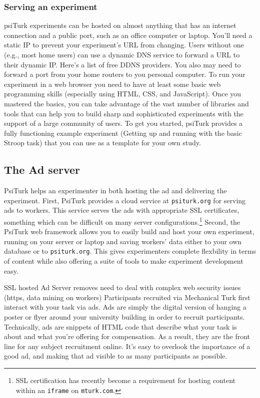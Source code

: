 \documentclass[jou,apacite]{apa6}
\begin{document}
\subsubsection{Serving an experiment}
psiTurk experiments can be hosted on almost anything that has an internet connection and a public port, such as an office computer or laptop.
You'll need a static IP to prevent your experiment's URL from changing. 
Users without one (e.g., most home users) can use a dynamic DNS service to forward a URL to their dynamic IP.
Here's a list of free DDNS providers.
You also may need to forward a port from your home routers to you personal computer.
To run your experiment in a web browser you need to have at least some basic web programming skills (especially using HTML, CSS, and JavaScript).
Once you mastered the basics, you can take advantage of the vast number of libraries and tools that can help you to build sharp and sophisticated experiments with the support of a large community of users.
To get you started, psiTurk provides a fully functioning example experiment (Getting up and running with the basic Stroop task) that you can use as a template for your own study.


\subsection{The Ad server}

PsiTurk helps an experimenter in both hosting the ad and delivering the experiment.
First, PsiTurk provides a cloud service at \texttt{psiturk.org} for serving ads to workers.
This service serves the ads with appropriate SSL certificates, something which can be difficult on many server configurations.\footnote{SSL certification has recently become a requirement for hosting content within an \texttt{iframe} on \texttt{mturk.com}.}
Second, the PsiTurk web framework allows you to easily build and host your own experiment, running on your server or laptop and saving workers' data either to your own database  or to \texttt{psiturk.org}.
This gives experimenters complete flexbility in terms of content while also offering a suite of tools to make experiment development easy.

SSL hosted Ad Server removes need to deal with complex web security issues (https, data mining on workers) 
Participants recruited via Mechanical Turk first interact with your task via ads. Ads are simply the digital version of hanging a poster or flyer around your university building in order to recruit participants. Technically, ads are snippets of HTML code that describe what your task is about and what you're offering for compensation. As a result, they are the front line for any subject recruitment online. It's easy to overlook the importance of a good ad, and making that ad visible to as many participants as possible.
\end{document}
